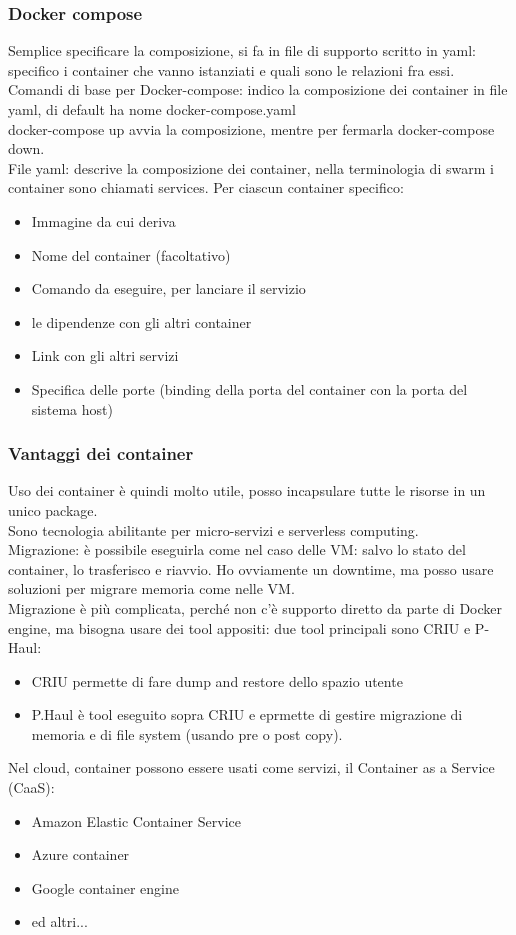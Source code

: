 \documentclass{article}
\begin{document}
\subsubsection{Docker compose}
Semplice specificare la composizione, si fa in file di supporto scritto in yaml: specifico i container che vanno istanziati e quali sono le relazioni fra essi.\\  
Comandi di base per Docker-compose: indico la composizione dei container in file yaml, di default ha nome docker-compose.yaml\\ docker-compose up avvia la composizione, mentre per fermarla docker-compose down.\\ File yaml: descrive la composizione dei container, nella terminologia di swarm i container sono chiamati services. Per ciascun container specifico:
\begin{itemize}
\item Immagine da cui deriva
\item Nome del container (facoltativo)
\item Comando da eseguire, per lanciare il servizio
\item le dipendenze con gli altri container
\item Link con gli altri servizi
\item Specifica delle porte (binding della porta del container con la porta del sistema host)
\end{itemize}
\subsubsection{Vantaggi dei container}
Uso dei container è quindi molto utile, posso incapsulare tutte le risorse in un unico package.\\ Sono tecnologia abilitante per micro-servizi e serverless computing.\\
Migrazione: è possibile eseguirla come nel caso delle VM: salvo lo stato del container, lo trasferisco e riavvio. Ho ovviamente un downtime, ma posso usare soluzioni per migrare memoria come nelle VM.\\ Migrazione è più complicata, perché non c'è supporto diretto da parte di Docker engine, ma bisogna usare dei tool appositi: due tool principali sono CRIU e P-Haul:
\begin{itemize}
\item CRIU permette di fare dump and restore dello spazio utente
\item P.Haul è tool eseguito sopra CRIU e eprmette di gestire migrazione di memoria e di file system (usando pre o post copy).
\end{itemize}
Nel cloud, container possono essere usati come servizi, il Container as a Service (CaaS):
\begin{itemize}
\item Amazon Elastic Container Service
\item Azure container
\item Google container engine
\item ed altri...
\end{itemize}
\end{document}
